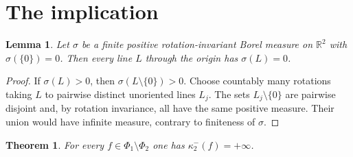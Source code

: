 \documentclass[11pt]{article}
\newtheorem{theorem}{Theorem}
\newtheorem{lemma}{Lemma}
\newcommand{\R}{\mathbb R}
\begin{document}
\section{The implication}

\begin{lemma}\label{lem:line}
Let $\sigma$ be a finite positive rotation-invariant Borel measure on
$\R^2$ with $\sigma(\{0\})=0$.  Then every line $L$ through the origin has
$\sigma(L)=0$.
\end{lemma}

\begin{proof}
If $\sigma(L)>0$, then $\sigma(L\setminus\{0\})>0$.  Choose countably many
rotations taking $L$ to pairwise distinct unoriented lines $L_j$.  The sets
$L_j\setminus\{0\}$ are pairwise disjoint and, by rotation invariance, all
have the same positive measure.  Their union would have infinite measure,
contrary to finiteness of $\sigma$.
\end{proof}

\begin{theorem}\label{thm:answer}
For every $f\in\Phi_1\setminus\Phi_2$ one has
$\kappa_2^-(f)=+\infty$.
\end{theorem}
\end{document}
